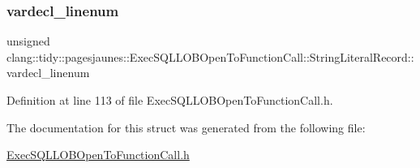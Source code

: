 \subsubsection{\texorpdfstring{vardecl\+\_\+linenum}{vardecl\_linenum}}
{\footnotesize\ttfamily unsigned clang\+::tidy\+::pagesjaunes\+::\+Exec\+S\+Q\+L\+L\+O\+B\+Open\+To\+Function\+Call\+::\+String\+Literal\+Record\+::vardecl\+\_\+linenum}



Definition at line 113 of file Exec\+S\+Q\+L\+L\+O\+B\+Open\+To\+Function\+Call.\+h.



The documentation for this struct was generated from the following file\+:\begin{DoxyCompactItemize}
\item 
\hyperlink{_exec_s_q_l_l_o_b_open_to_function_call_8h}{Exec\+S\+Q\+L\+L\+O\+B\+Open\+To\+Function\+Call.\+h}\end{DoxyCompactItemize}
